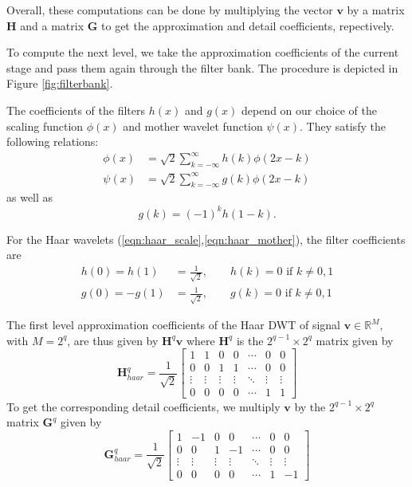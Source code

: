 Overall, these computations can be done by multiplying the vector $\bm v$ by a matrix $\bm H$ and a matrix $\bm G$ to get the approximation and detail coefficients, repectively.

To compute the next level, we take the approximation coefficients of the current stage and pass them again through the filter bank.
The procedure is depicted in Figure \ref{fig:filterbank}.

The coefficients of the filters $h(x)$ and $g(x)$ depend on our choice of the scaling function $\phi(x)$ and mother wavelet function $\psi(x)$.
They satisfy the following relations:
\begin{equation*}
  \begin{split}
    \phi(x) &= \sqrt{2}\sum_{k=-\infty}^\infty h(k)\phi(2x - k)\\
    \psi(x) &= \sqrt{2}\sum_{k=-\infty}^\infty g(k)\phi(2x - k)
  \end{split}
\end{equation*}
as well as
\begin{equation*}
  g(k) = (-1)^k h(1-k).
\end{equation*}

For the Haar wavelets (\ref{eqn:haar_scale},\ref{eqn:haar_mother}), the filter coefficients are
\begin{equation*}
  \begin{split}
    h(0) = h(1) &= \frac{1}{\sqrt{2}}, \qquad h(k) = 0 \mbox{  if $k\neq 0,1$}\\
    g(0) = -g(1) &= \frac{1}{\sqrt{2}}, \qquad g(k) = 0 \mbox{  if $k\neq 0,1$}
  \end{split}
\end{equation*}

The first level approximation coefficients of the Haar DWT of signal $\bm v \in\mathbb{R}^M$, with $M=2^q$, are thus given by $\bm H^q \bm v$ where $\bm H^q$ is the $2^{q-1}\times 2^q$ matrix given by
\begin{equation}
  \label{eqn:haar_H}
  \bm H^q_{haar} = \frac{1}{\sqrt{2}} \begin{bmatrix}
    1&1&0&0&\cdots&0&0\\
    0&0&1&1&\cdots&0&0\\
    \vdots&\vdots&\vdots&\vdots&\ddots&\vdots&\vdots\\
    0&0&0&0&\cdots&1&1
  \end{bmatrix}
\end{equation}
To get the corresponding detail coefficients, we multiply $\bm v$ by the $2^{q-1}\times 2^q$ matrix $\bm G^q$ given by
\begin{equation}
  \label{eqn:haar_G}
  \bm G^q_{haar} = \frac{1}{\sqrt{2}} \begin{bmatrix}
    1&-1&0&0&\cdots&0&0\\
    0&0&1&-1&\cdots&0&0\\
    \vdots&\vdots&\vdots&\vdots&\ddots&\vdots&\vdots\\
    0&0&0&0&\cdots&1&-1
  \end{bmatrix}
\end{equation}

